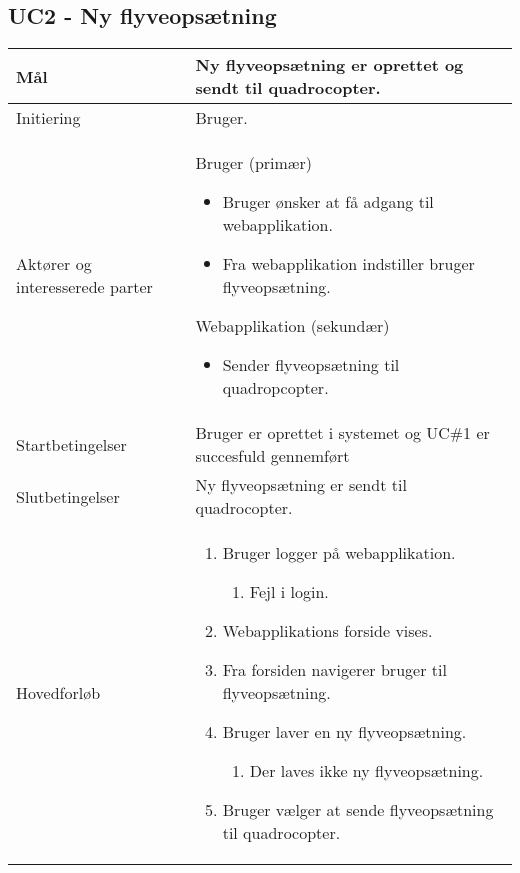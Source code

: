 \subsection*{UC2 - Ny flyveopsætning}

\begin{table}[H]
\begin{tabular}{|l|p{10cm}|}
\hline

Mål	 							& Ny flyveopsætning er oprettet og sendt til quadrocopter. \\\hline
Initiering							& Bruger. \\\hline
Aktører og interesserede parter			& Bruger (primær) 
										\begin{itemize}
											\item Bruger ønsker at få adgang til webapplikation.
											\item Fra webapplikation indstiller bruger flyveopsætning.
										\end{itemize}
									  Webapplikation (sekundær)
										\begin{itemize}
											\item Sender flyveopsætning til quadropcopter.
										\end{itemize} \\\hline
Startbetingelser						& Bruger er oprettet i systemet og UC\#1 er succesfuld gennemført  \\\hline
Slutbetingelser						& Ny flyveopsætning er sendt til quadrocopter. \\\hline
Hovedforløb				&
 
									\renewcommand{\labelenumi}{\arabic{enumi}.}
									\renewcommand{\labelenumii}{\Roman{enumii}:}

									\begin{enumerate}[topsep=0.0cm, leftmargin=0.5cm]
										\item Bruger logger på webapplikation.
										\begin{enumerate}[partopsep=4cm, topsep=0cm, leftmargin=1cm]
												\item Fejl i login.
										\end{enumerate}
										\item Webapplikations forside vises.
										\item Fra forsiden navigerer bruger til flyveopsætning.
										\item Bruger laver en ny flyveopsætning.
										\begin{enumerate}[partopsep=4cm, topsep=0cm, leftmargin=1cm]
												\item Der laves ikke ny flyveopsætning.
										\end{enumerate}
										\item Bruger vælger at sende flyveopsætning til quadrocopter.
									\end{enumerate} \\\hline	


\end{tabular}
\end{table}
